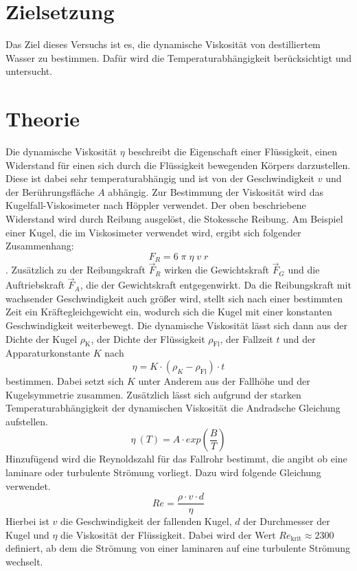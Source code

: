 
\section{Zielsetzung}
Das Ziel dieses Versuchs ist es, die dynamische Viskosität von destilliertem Wasser zu bestimmen.
Dafür wird die Temperaturabhängigkeit berücksichtigt und untersucht.

\section{Theorie}
Die dynamische Viskosität $\eta$ beschreibt die Eigenschaft einer Flüssigkeit, einen Widerstand für einen sich durch die Flüssigkeit bewegenden Körpers darzustellen.
Diese ist dabei sehr temperaturabhängig und ist von der Geschwindigkeit $v$ und der Berührungsfläche $A$ abhängig.
Zur Bestimmung der Viskosität wird das Kugelfall-Viskosimeter nach Höppler verwendet.
Der oben beschriebene Widerstand wird durch Reibung ausgelöst, die Stokessche Reibung.
Am Beispiel einer Kugel, die im Viskosimeter verwendet wird, ergibt sich folgender Zusammenhang:
\begin{equation}
    F_R = 6  \; \pi \; \eta \; v \; r
\end{equation}.
Zusätzlich zu der Reibungskraft $\vec{F}_R$ wirken die Gewichtskraft $\vec{F}_G$ und die Auftriebskraft $\vec{F}_A$, die der Gewichtskraft entgegenwirkt.
Da die Reibungskraft mit wachsender Geschwindigkeit auch größer wird, stellt sich nach einer bestimmten Zeit ein Kräftegleichgewicht ein, wodurch sich die Kugel mit einer konstanten Geschwindigkeit weiterbewegt.
Die dynamische Viskosität lässt sich dann aus der Dichte der Kugel $\rho_\text{K}$, der Dichte der Flüssigkeit $\rho_\text{Fl}$, der Fallzeit $t$ und der Apparaturkonstante $K$ nach
\begin{equation}
    \eta = K \cdot (\rho_K-\rho_\text{Fl}) \cdot t
\end{equation} 
bestimmen.
Dabei setzt sich $K$ unter Anderem aus der Fallhöhe und der Kugelsymmetrie zusammen.
Zusätzlich lässt sich aufgrund der starken Temperaturabhängigkeit der dynamischen Viskosität die Andradsche Gleichung aufstellen.
\begin{equation}
    \eta \:(T) = A \cdot exp \left (\frac{B}{T} \right )
\end{equation}
Hinzufügend wird die Reynoldszahl für das Fallrohr bestimmt, die angibt ob eine laminare oder turbulente Strömung vorliegt.
Dazu wird folgende Gleichung verwendet.
\begin{equation}
    Re = \frac{\rho \cdot v \cdot d}{\eta}
\end{equation}
Hierbei ist $v$ die Geschwindigkeit der fallenden Kugel, $d$ der Durchmesser der Kugel und $\eta$ die Viskosität der Flüssigkeit.
Dabei wird der Wert $Re_\text{krit} \approx 2300$ definiert, ab dem die Strömung von einer laminaren auf eine turbulente Strömung wechselt.

